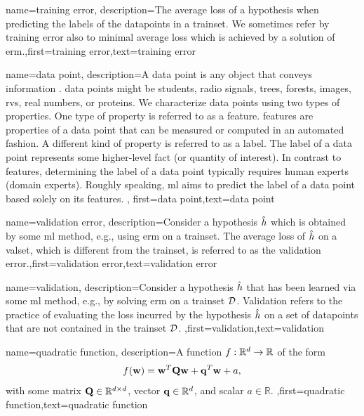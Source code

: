 {
	name={training error},
	description={The average \gls{loss} of a \gls{hypothesis} when 
		predicting the \gls{label}s of the \gls{datapoint}s in a \gls{trainset}. 
		We sometimes refer by training error also to minimal average \gls{loss} 
		which is achieved by a solution of \gls{erm}.},first={training error},text={training error}  
}

{name={data point},
description={A \gls{data} point is any object that conveys information \cite{coverthomas}. \Gls{data} points might be 
		students, radio signals, trees, forests, images, \gls{rv}s, real numbers, or proteins. We characterize \gls{data} points 
		using two types of properties. One type of property is referred to as a \gls{feature}. \Gls{feature}s are properties of a 
		\gls{data} point that can be measured or computed in an automated fashion. 
		A different kind of property is referred to as a \gls{label}. The \gls{label} of 
		a \gls{data} point represents some higher-level fact (or quantity of interest). In 
		contrast to \gls{feature}s, determining the \gls{label} of a \gls{data} point typically 
		requires human experts (domain experts). Roughly speaking, \gls{ml} aims to predict 
		the \gls{label} of a \gls{data} point based solely on its \gls{feature}s. 
		}, first={data point},text={data point}  
}


{name={validation error},
 description={Consider a \gls{hypothesis} $\hat{h}$ which is 
 	obtained by some \gls{ml} method, e.g., using \gls{erm} on a \gls{trainset}. The average \gls{loss} 
 	of $\hat{h}$ on a \gls{valset}, which is different from the \gls{trainset}, is referred 
 	to as the \gls{validation} error.},first={validation error},text={validation error}  
}

{name={validation},
	description={Consider a \gls{hypothesis} $\hat{h}$ that has been 
		learned via some \gls{ml} method, e.g., by solving \gls{erm} on a \gls{trainset} $\mathcal{D}$. 
		Validation refers to the practice of evaluating the \gls{loss} incurred by the 
		\gls{hypothesis} $\hat{h}$ on a set of 
		\gls{datapoint}s that are not contained in the \gls{trainset} $\mathcal{D}$. },first={validation},text={validation}  
}

{name={quadratic function},
	description={A function $f: \mathbb{R}^{d} \rightarrow \mathbb{R}$ of the form 
	$$f({\bf w}) =  {\bf w}^{T} \mathbf{Q} \mathbf{w} + \mathbf{q}^{T} {\bf w}+a,$$ with 
	some matrix $\mathbf{Q} \in \mathbb{R}^{d \times d}$, vector ${\bf q} \in \mathbb{R}^{d}$, 
	and scalar $a \in \mathbb{R}$.  },first={quadratic function},text={quadratic function}  
}

